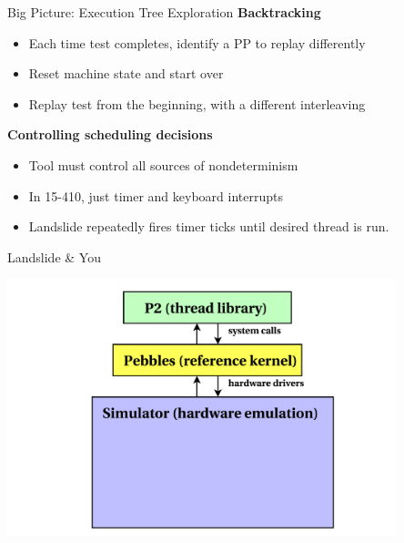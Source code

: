 \documentclass[xcolor=dvipsnames]{beamer}
\begin{document}
\begin{frame}{Big Picture: Execution Tree Exploration}
	\textbf{Backtracking}
	\begin{itemize}
		\item Each time test completes, identify a PP to replay differently
		\item Reset machine state and start over
		\item Replay test from the beginning, with a different interleaving
	\end{itemize}
	\pause
	\linegap

	{\bf Controlling scheduling decisions}
	\begin{itemize}
		\item Tool must control all sources of nondeterminism
		\item In 15-410, just timer and keyboard interrupts
		\item Landslide repeatedly fires timer ticks until desired thread is run.
	\end{itemize}
\end{frame}

\begin{frame}{Landslide \& You}
	\begin{center}
	\includegraphics[width=0.85\textwidth]{landslide-new-blank.pdf}
	\end{center}
\end{frame}
\end{document}
